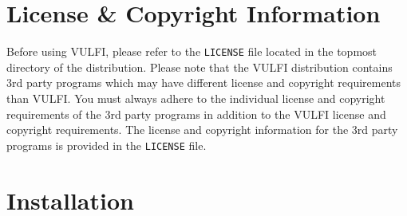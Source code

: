 \documentclass[12pt,a4paper]{article}
\begin{document}
% 

\section{License \& Copyright Information}
\label{license}
Before using VULFI, please refer to the \texttt{LICENSE} file located in the topmost directory of the 
distribution. 
%
Please note that the VULFI distribution contains 3rd party programs which may have different license 
and copyright requirements than VULFI.
%
You must always adhere to the individual license and copyright requirements of the 3rd party 
programs in addition to the VULFI license and copyright requirements.
%
%
The license and copyright information for the 3rd party programs is provided in the \texttt{LICENSE} file.

% 
% 
% 


\section{Installation}
\label{install}
\end{document}
